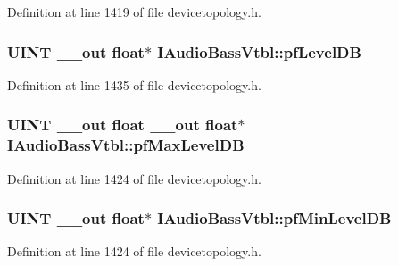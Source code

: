 Definition at line 1419 of file devicetopology.\+h.

\subsubsection[{\texorpdfstring{pf\+Level\+DB}{pfLevelDB}}]{ {\bf U\+I\+NT} {\bf \+\_\+\+\_\+out} float$\ast$ I\+Audio\+Bass\+Vtbl\+::pf\+Level\+DB}\hypertarget{struct_i_audio_bass_vtbl_acef96922b5fdd62b50f98702bb89750c}{}\label{struct_i_audio_bass_vtbl_acef96922b5fdd62b50f98702bb89750c}


Definition at line 1435 of file devicetopology.\+h.

\subsubsection[{\texorpdfstring{pf\+Max\+Level\+DB}{pfMaxLevelDB}}]{ {\bf U\+I\+NT} {\bf \+\_\+\+\_\+out} float {\bf \+\_\+\+\_\+out} float$\ast$ I\+Audio\+Bass\+Vtbl\+::pf\+Max\+Level\+DB}\hypertarget{struct_i_audio_bass_vtbl_a7f4e1864694e8b7015931ab0fae0ab53}{}\label{struct_i_audio_bass_vtbl_a7f4e1864694e8b7015931ab0fae0ab53}


Definition at line 1424 of file devicetopology.\+h.

\subsubsection[{\texorpdfstring{pf\+Min\+Level\+DB}{pfMinLevelDB}}]{ {\bf U\+I\+NT} {\bf \+\_\+\+\_\+out} float$\ast$ I\+Audio\+Bass\+Vtbl\+::pf\+Min\+Level\+DB}\hypertarget{struct_i_audio_bass_vtbl_ae2f34dbf7ee024b9c4d813218bb61dc9}{}\label{struct_i_audio_bass_vtbl_ae2f34dbf7ee024b9c4d813218bb61dc9}


Definition at line 1424 of file devicetopology.\+h.

